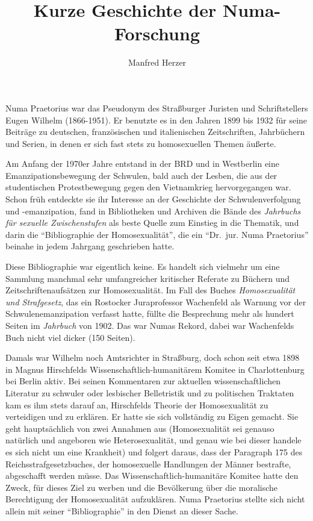 \documentclass[a4paper,
fontsize=11pt,
oneside,
numbers=noperiodatend,
parskip=half-,
bibliography=totoc,
final
]{scrartcl}
\title{\LARGE{Kurze Geschichte der Numa-Forschung
}} %
\author{Manfred Herzer} %
\date{}
\begin{document}
\maketitle
\thispagestyle{fancyplain} 


Numa Praetorius war das Pseudonym des Straßburger Juristen und
Schriftstellers Eugen Wilhelm (1866-1951). Er benutzte es in den Jahren
1899 bis 1932 für seine Beiträge zu deutschen, französischen und
italienischen Zeitschriften, Jahrbüchern und Serien, in denen er sich
fast stets zu homosexuellen Themen äußerte.

Am Anfang der 1970er Jahre entstand in der BRD und in Westberlin eine
Emanzipationsbewegung der Schwulen, bald auch der Lesben, die aus der
studentischen Protestbewegung gegen den Vietnamkrieg hervorgegangen war.
Schon früh entdeckte sie ihr Interesse an der Geschichte der
Schwulenverfolgung und -emanzipation, fand in Bibliotheken und Archiven
die Bände des \emph{Jahrbuchs für sexuelle Zwischenstufen} als beste
Quelle zum Einstieg in die Thematik, und darin die
\enquote{Bibliographie der Homosexualität}, die ein \enquote{Dr.~jur.
Numa Praetorius} beinahe in jedem Jahrgang geschrieben hatte.

Diese Bibliographie war eigentlich keine. Es handelt sich vielmehr um
eine Sammlung manchmal sehr umfangreicher kritischer Referate zu Büchern
und Zeitschriftenaufsätzen zur Homosexualität. Im Fall des Buches
\emph{Homosexualität und Strafgesetz}, das ein Rostocker Juraprofessor
Wachenfeld als Warnung vor der Schwulenemanzipation verfasst hatte,
füllte die Besprechung mehr als hundert Seiten im \emph{Jahrbuch} von
1902. Das war Numas Rekord, dabei war Wachenfelds Buch nicht viel dicker
(150 Seiten).

Damals war Wilhelm noch Amtsrichter in Straßburg, doch schon seit etwa
1898 in Magnus Hirschfelds Wissenschaftlich-humanitärem Komitee in
Charlottenburg bei Berlin aktiv. Bei seinen Kommentaren zur aktuellen
wissenschaftlichen Literatur zu schwuler oder lesbischer Belletristik
und zu politischen Traktaten kam es ihm stets darauf an, Hirschfelds
Theorie der Homosexualität zu verteidigen und zu erklären. Er hatte sie
sich vollständig zu Eigen gemacht. Sie geht hauptsächlich von zwei
Annahmen aus (Homosexualität sei genauso natürlich und angeboren wie
Heterosexualität, und genau wie bei dieser handele es sich nicht um eine
Krankheit) und folgert daraus, dass der Paragraph 175 des
Reichsstrafgesetzbuches, der homosexuelle Handlungen der Männer
bestrafte, abgeschafft werden müsse. Das Wissenschaftlich-humanitäre
Komitee hatte den Zweck, für dieses Ziel zu werben und die Bevölkerung
über die moralische Berechtigung der Homosexualität aufzuklären. Numa
Praetorius stellte sich nicht allein mit seiner \enquote{Bibliographie}
in den Dienst an dieser Sache.
\end{document}

